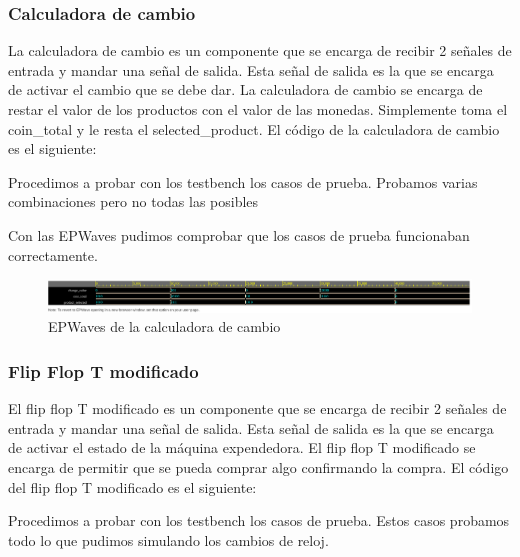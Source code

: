 \documentclass[12pt]{article}  %
\begin{document}
\subsubsection{Calculadora de cambio}
La calculadora de cambio es un componente que se encarga de recibir 2 señales de entrada y mandar una señal de salida. Esta señal de salida es la que se encarga de activar el cambio que se debe dar. La calculadora de cambio se encarga de restar el valor de los productos con el valor de las monedas. Simplemente toma el coin\_total y le resta el selected\_product. El código de la calculadora de cambio es el siguiente:



Procedimos a probar con los testbench los casos de prueba. Probamos varias combinaciones pero no todas las posibles



Con las EPWaves pudimos comprobar que los casos de prueba funcionaban correctamente.

\begin{figure}[!ht]
  \centering
  \caption{EPWaves de la calculadora de cambio}
  \includegraphics[width=0.75\linewidth]{Imagenes/EPWaves/change-calculator-wave.png}
\end{figure}

\subsubsection{Flip Flop T modificado}
El flip flop T modificado es un componente que se encarga de recibir 2 señales de entrada y mandar una señal de salida. Esta señal de salida es la que se encarga de activar el estado de la máquina expendedora. El flip flop T modificado se encarga de permitir que se pueda comprar algo confirmando la compra. El código del flip flop T modificado es el siguiente:



Procedimos a probar con los testbench los casos de prueba. Estos casos probamos todo lo que pudimos simulando los cambios de reloj.


\end{document}
